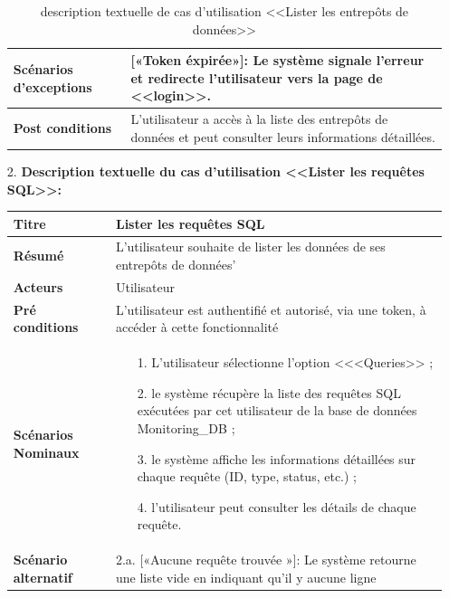 \begin{enumerate}
\begin{table}[H]
\begin{tabular}{|p{3.5cm}|p{12cm}|}
                \hline  \textbf{Scénarios d'exceptions} & 
                    [«Token éxpirée»]: Le système signale l'erreur et redirecte l'utilisateur vers la page de <<login>>.\\
                \hline \textbf{Post conditions} & L'utilisateur a accès à la liste des entrepôts de données et peut consulter leurs informations détaillées.
         \\
                \hline
            \end{tabular}
            \caption{description textuelle de cas d'utilisation <<Lister les entrepôts de données>>}
        \end{table}
        \newpage
        \vspace{2cm}
        \item[2.] \textbf{Description textuelle du cas d'utilisation <<Lister les requêtes SQL>>:}
    \begin{table}[H]
        \centering
            \begin{tabular}{|p{3.5cm}|p{12cm}|}
                \hline \textbf{Titre} &  Lister les requêtes SQL \\
                \hline \textbf{Résumé} & L'utilisateur souhaite de lister les données de ses entrepôts de données' \\
                \hline \textbf{Acteurs} & Utilisateur \\
                \hline \textbf{Pré conditions }& L'utilisateur est authentifié et autorisé, via une token, à accéder à cette fonctionnalité\\
                \hline \textbf{Scénarios Nominaux} &
                    \begin{enumerate}
                        \item [1.] L'utilisateur sélectionne l'option <<<Queries>> ;
                        \item [2.] le système récupère la liste des requêtes SQL exécutées par cet utilisateur de la base de données Monitoring\_DB ;
                        \item [3.] le système affiche les informations détaillées sur chaque requête (ID, type, status, etc.) ;
                        \item [4.] l'utilisateur peut consulter les détails de chaque requête.      
                    \end{enumerate}\\
                        \hline \textbf{Scénario alternatif} & 
                            2.a. \hspace{0.3cm} [«Aucune requête trouvée »]: Le système retourne une liste vide en indiquant qu'il y aucune ligne\\

\end{tabular}
\end{table}
\end{enumerate}
